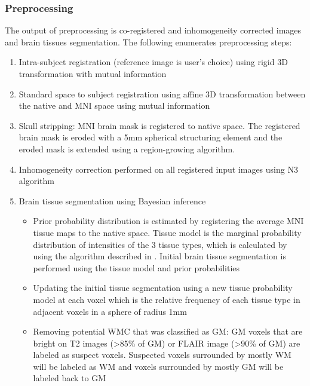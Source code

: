 \subsubsection{Preprocessing}
The output of preprocessing is co-registered and inhomogeneity corrected images and brain tissues segmentation. The following enumerates preprocessing steps:
\begin{enumerate}
\item Intra-subject registration (reference image is user’s choice) using rigid 3D transformation with mutual information
\item Standard space to subject registration using affine 3D transformation between the native and MNI space using mutual information
\item Skull stripping: MNI brain mask is registered to native space. The registered brain mask is eroded with a 5mm spherical structuring element and the eroded mask is extended using a region-growing algorithm.
\item Inhomogeneity correction performed on all registered input images using N3 algorithm \cite{N3}
\item Brain tissue segmentation using Bayesian inference
\begin{itemize}
    \item Prior probability distribution is estimated by registering the average MNI tissue maps to the native space. Tissue model is the marginal probability distribution of intensities of the 3 tissue types, which is calculated by using the algorithm described in \cite{EM_Empirical}. Initial brain tissue segmentation is performed using the tissue model and prior probabilities
    \item Updating the initial tissue segmentation using a new tissue probability model at each voxel which is the relative frequency of each tissue type in adjacent voxels in a sphere of radius 1mm
    \item Removing potential WMC that was classified as GM: GM voxels that are bright on T2 images (>85\% of GM) or FLAIR image (>90\% of GM) are labeled as suspect voxels. Suspected voxels surrounded by mostly WM will be labeled as WM and voxels surrounded by mostly GM will be labeled back to GM
\end{itemize}
\end{enumerate}
  
  
  
  
  
  
  